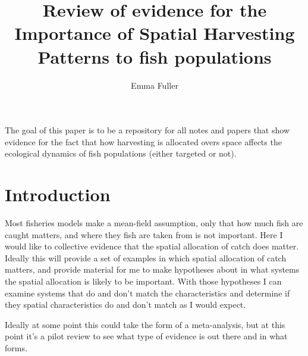 \documentclass[12pt, a4paper]{article}
\title{Review of evidence for the Importance of Spatial Harvesting Patterns to fish populations}
\author{Emma Fuller}
\date{} 	%
\begin{document}
\maketitle
\noindent The goal of this paper is to be a repository for all notes and papers that show evidence for the fact that how harvesting is allocated overs space affects the ecological dynamics of fish populations (either targeted or not). 

\tableofcontents


\section{Introduction}
Most fisheries models make a mean-field assumption, only that how much fish are caught matters, and where they fish are taken from is not important. Here I would like to collective evidence that the spatial allocation of catch does matter. Ideally this will provide a set of examples in which spatial allocation of catch matters, and provide material for me to make hypotheses about in what systems the spatial allocation is likely to be important. With those hypotheses I can examine systems that do and don't match the characteristics and determine if they spatial characteristics do and don't match as I would expect. 

Ideally at some point this could take the form of a meta-analysis, but at this point it's a pilot review to see what type of evidence is out there and in what forms. 



\end{document}
